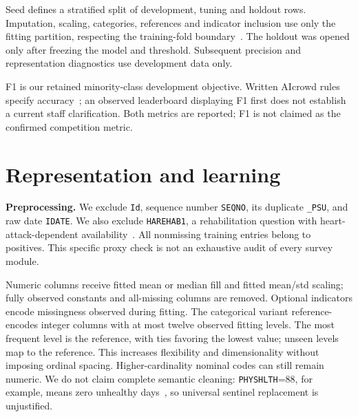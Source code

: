 \documentclass[10pt,conference,compsocconf]{IEEEtran}
\begin{document}
Seed \Seed{} defines a stratified split of \NDevelopment{} development,
\NTuning{} tuning and \NHoldout{} holdout rows. Imputation, scaling, categories,
references and indicator inclusion use only the fitting partition, respecting
the training-fold boundary~\cite{leakage}.
The holdout was opened only after freezing the model and threshold.
Subsequent precision and representation diagnostics use development data only.

F1 is our retained minority-class development objective.
Written AIcrowd rules specify accuracy~\cite{rules}; an observed leaderboard
displaying F1 first does not establish a current staff clarification.
Both metrics are reported; F1 is not claimed as the confirmed competition metric.

\section{Representation and learning}
\textbf{Preprocessing.}
We exclude \texttt{Id}, sequence number \texttt{SEQNO}, its duplicate
\texttt{\_PSU}, and raw date \texttt{IDATE}. We also exclude \texttt{HAREHAB1},
a rehabilitation question with heart-attack-dependent availability~\cite{codebook}.
All \ProxyObserved{} nonmissing training entries belong to positives.
This specific proxy check is not an exhaustive audit of every survey module.

Numeric columns receive fitted mean or median fill and fitted mean/std scaling;
fully observed constants and all-missing columns are removed.
Optional indicators encode missingness observed during fitting.
The categorical variant reference-encodes integer columns with at most twelve
observed fitting levels. The most frequent level is the reference, with ties
favoring the lowest value; unseen levels map to the reference.
This increases flexibility and dimensionality without imposing ordinal spacing.
Higher-cardinality nominal codes can still remain numeric.
We do not claim complete semantic cleaning: \texttt{PHYSHLTH}=88, for example,
means zero unhealthy days~\cite{codebook}, so universal sentinel replacement
is unjustified.
\end{document}
